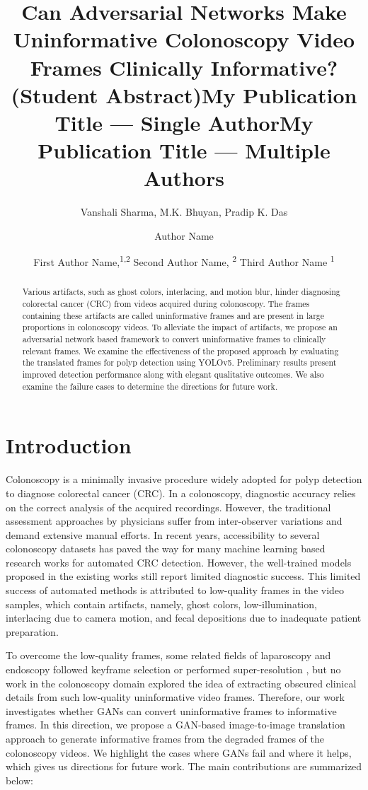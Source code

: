 \documentclass[letterpaper]{article} %
\title{Can Adversarial Networks Make Uninformative Colonoscopy Video Frames Clinically Informative? (Student Abstract)}
\author{
    Vanshali Sharma,
    M.K. Bhuyan,
    Pradip K. Das
}
\title{My Publication Title --- Single Author}
\author {
    Author Name
}
\title{My Publication Title --- Multiple Authors}
\author {
    First Author Name,\textsuperscript{\rm 1,\rm 2}
    Second Author Name, \textsuperscript{\rm 2}
    Third Author Name \textsuperscript{\rm 1}
}
\begin{document}
\maketitle

\begin{abstract}
Various artifacts, such as ghost colors, interlacing, and motion blur, hinder diagnosing colorectal cancer (CRC) from videos acquired during colonoscopy. The frames containing these artifacts are called uninformative frames and are present in large proportions in colonoscopy videos. To alleviate the impact of artifacts,  we propose an adversarial network based framework to convert uninformative frames to clinically relevant frames. We examine the effectiveness of the proposed approach by evaluating the translated frames for polyp detection using YOLOv5. Preliminary results present improved detection performance along with elegant qualitative outcomes. We also examine the failure cases to determine the directions for future work.
\end{abstract}

\section{Introduction}

Colonoscopy is a minimally invasive procedure widely adopted for polyp detection to diagnose colorectal cancer (CRC). In a colonoscopy, diagnostic accuracy relies on the correct analysis of the acquired recordings. However, the traditional assessment approaches by physicians suffer from inter-observer variations and demand extensive manual efforts. In recent years, accessibility to several colonoscopy datasets has paved the way for many machine learning based research works for automated CRC detection. However, the well-trained models proposed in the existing works still report limited diagnostic success. This limited success of automated methods is attributed to low-quality frames in the video samples, which contain artifacts, namely, ghost colors, low-illumination, interlacing due to camera motion, and fecal depositions due to inadequate patient preparation. 

\par To overcome the low-quality frames, some related fields of laparoscopy and endoscopy followed keyframe selection \cite{ma2020keyframe} or performed super-resolution \cite{almalioglu2020endol2h}, but no work in the colonoscopy domain explored the idea of extracting obscured clinical details from such low-quality uninformative video frames. Therefore, our work investigates whether GANs can convert uninformative frames to informative frames. In this direction, we propose a GAN-based image-to-image translation approach to generate informative frames from the degraded frames of the colonoscopy videos. We highlight the cases where GANs fail and where it helps, which gives us directions for future work.
The main contributions are summarized below:
\end{document}
